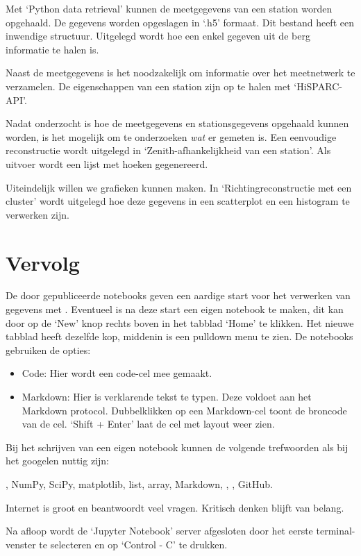 Met `Python data retrieval' kunnen de meetgegevens van een station worden opgehaald. De gegevens worden opgeslagen in `.h5' formaat. Dit bestand heeft een inwendige structuur. Uitgelegd wordt hoe een enkel gegeven uit de berg informatie te halen is.

Naast de meetgegevens is het noodzakelijk om informatie over het meetnetwerk te verzamelen. De eigenschappen van een station zijn op te halen met `HiSPARC-API'.

Nadat onderzocht is hoe de meetgegevens en stationsgegevens opgehaald kunnen worden, is het mogelijk om te onderzoeken \textit{wat} er gemeten is. Een eenvoudige reconstructie wordt uitgelegd in `Zenith-afhankelijkheid van een station'. Als uitvoer wordt een lijst met hoeken gegenereerd.

Uiteindelijk willen we grafieken kunnen maken. In `Richtingreconstructie met een cluster' wordt uitgelegd hoe deze gegevens in een scatterplot en een histogram te verwerken zijn.

\section{Vervolg}

De door \hisparc gepubliceerde notebooks geven een aardige start voor het verwerken van gegevens met \python.
Eventueel is na deze start een eigen notebook te maken, dit kan door op de `New' knop rechts boven in het tabblad `Home' te
klikken. Het nieuwe tabblad heeft dezelfde kop, middenin is een pulldown menu te zien. De notebooks gebruiken de opties:

\begin{itemize}
\item Code: Hier wordt een code-cel mee gemaakt.
\item Markdown: Hier is verklarende tekst te typen. Deze voldoet aan het Markdown protocol. Dubbelklikken op een Markdown-cel
toont de broncode van de cel. `Shift + Enter' laat de cel met layout weer zien.
\end{itemize}

Bij het schrijven van een eigen notebook kunnen de volgende trefwoorden als bij het googelen nuttig zijn:

\python, NumPy, SciPy, matplotlib, list, array, Markdown, \hisparc, \sapphire, GitHub.

Internet is groot en beantwoordt veel vragen. Kritisch denken blijft van belang.

Na afloop wordt de `Jupyter Notebook' server afgesloten door
het eerste terminal-venster te selecteren en op `Control - C' te drukken.


